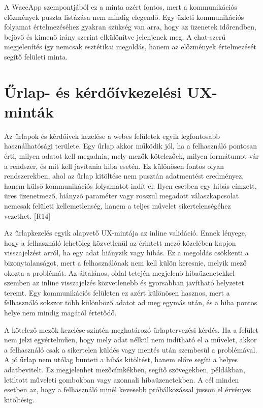A WaccApp szempontjából ez a minta azért fontos, mert a kommunikációs előzmények puszta listázása nem mindig elegendő. Egy üzleti kommunikációs folyamat értelmezéséhez gyakran szükség van arra, hogy az üzenetek időrendben, bejövő és kimenő irány szerint elkülönítve jelenjenek meg. A chat-szerű megjelenítés így nemcsak esztétikai megoldás, hanem az előzmények értelmezését segítő felületi minta.

\section{Űrlap- és kérdőívkezelési UX-minták}

Az űrlapok és kérdőívek kezelése a webes felületek egyik legfontosabb használhatósági területe. Egy űrlap akkor működik jól, ha a felhasználó pontosan érti, milyen adatot kell megadnia, mely mezők kötelezőek, milyen formátumot vár a rendszer, és mit kell javítania hiba esetén. Ez különösen fontos olyan rendszerekben, ahol az űrlap kitöltése nem pusztán adatmentést eredményez, hanem külső kommunikációs folyamatot indít el. Ilyen esetben egy hibás címzett, üres üzenetmező, hiányzó paraméter vagy rosszul megadott válaszkapcsolat nemcsak felületi kellemetlenség, hanem a teljes művelet sikertelenségéhez vezethet. [R14]

Az űrlapkezelés egyik alapvető UX-mintája az inline validáció. Ennek lényege, hogy a felhasználó lehetőleg közvetlenül az érintett mező közelében kapjon visszajelzést arról, ha egy adat hiányzik vagy hibás. Ez a megoldás csökkenti a bizonytalanságot, mert a felhasználónak nem kell külön keresnie, melyik mező okozta a problémát. Az általános, oldal tetején megjelenő hibaüzenetekkel szemben az inline visszajelzés közvetlenebb és gyorsabban javítható helyzetet teremt. Egy kommunikációs felületen ez azért különösen hasznos, mert a felhasználó sokszor több különböző adatot ad meg egymás után, és a hiba pontos helye nem mindig magától értetődő.

A kötelező mezők kezelése szintén meghatározó űrlaptervezési kérdés. Ha a felület nem jelzi egyértelműen, hogy mely adat nélkül nem indítható el a művelet, akkor a felhasználó csak a sikertelen küldés vagy mentés után szembesül a problémával. A jó űrlap nem utólag bünteti a hibás kitöltést, hanem előre segíti a helyes adatbevitelt. Ez megjelenhet mezőcímkékben, segítő szövegekben, példákban, letiltott műveleti gombokban vagy azonnali hibaüzenetekben. A cél minden esetben az, hogy a felhasználó minél kevesebb próbálkozással jusson el érvényes kitöltésig.

